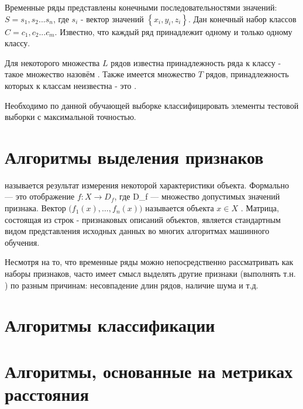 Временные ряды представлены конечными последовательностями значений: $S=s_1,s_2...s_n$, где $s_i$ - вектор значений $\left\{x_i,y_i,z_i\right\}$. Дан конечный набор классов $C=c_1,c_2...c_m$. Известно, что каждый ряд принадлежит одному и только одному классу. 

Для некоторого множества $L$ рядов известна принадлежность ряда к классу - такое множество назовём . Также имеется множество $T$ рядов, принадлежность которых к классам неизвестна - это .

Необходимо по данной обучающей выборке классифицировать элементы тестовой выборки с максимальной точностью.

\section{Алгоритмы выделения признаков}

 называется результат измерения некоторой характеристики объекта. Формально  — это отображение $f: X\to D_f $, где D\_f — множество допустимых значений признака. Вектор $\bigl( f_1(x),\ldots,f_n(x) \bigr)$ называется  объекта $x \in X$ \cite{features_def}. Матрица, состоящая из строк - признаковых описаний объектов, является стандартным видом представления исходных данных во многих алгоритмах машинного обучения. 

Несмотря на то, что временные ряды можно непосредственно рассматривать как наборы признаков, часто имеет смысл выделять другие признаки (выполнять т.н. ) по разным причинам: несовпадение длин рядов, наличие шума и т.д.







\section{Алгоритмы классификации}








\section{Алгоритмы, основанные на метриках расстояния}


